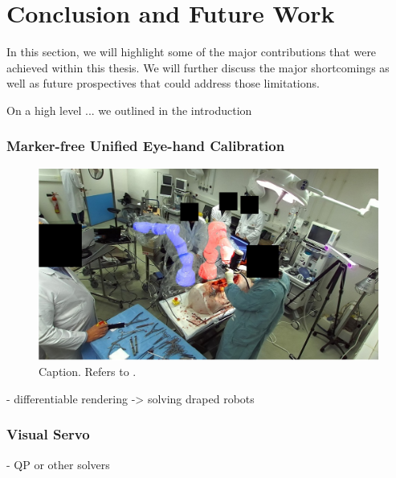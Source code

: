 \chapter[Conclusion and Future Work]{Conclusion and Future Work}
\label{chap:conclusion}
\minitoc

In this section, we will highlight some of the major contributions that were achieved within this thesis. We will further discuss the major shortcomings as well as future prospectives that could address those limitations. 

On a high level ... we outlined in the introduction




\subsection{Marker-free Unified Eye-hand Calibration}
\label{con:sec:marker_free}


\begin{figure}
    \centering
    \includegraphics[width=\textwidth]{conclusion/img/draped_ground_truth.pdf}
    \caption{Caption. Refers to .}
    \label{con:fig:draped_ground_truth}
\end{figure}

- differentiable rendering -> solving draped robots

\subsection{Visual Servo}
\label{con:sec:visual_servo}
- QP or other solvers


